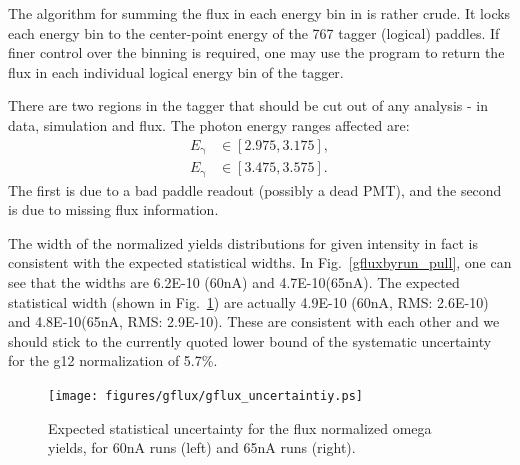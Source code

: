 \begin{v2}
The algorithm for summing the flux in each energy bin in  is rather crude. It locks each energy bin to the center-point energy of the 767 tagger (logical) paddles. If finer control over the binning is required, one may use the  program to return the flux in each individual logical energy bin of the tagger.

There are two regions in the tagger that should be cut out of any analysis - in data, simulation and flux. The photon energy ranges affected are:
\begin{eqnarray}
    E_\text{γ} &\in [2.975,3.175], \\ \nonumber
    E_\text{γ} &\in [3.475,3.575].
\end{eqnarray}
The first is due to a bad paddle readout (possibly a dead PMT), and the second is due to missing flux information.
\end{v2}
The width of the normalized yields distributions for given intensity in fact is consistent with the expected statistical widths. In Fig.~\ref{gfluxbyrun_pull}, one can see that the widths are 6.2E-10 (60nA) and 4.7E-10(65nA). The expected statistical width (shown in Fig.~\ref{gfluxbyrun_uncertain}) are actually 4.9E-10 (60nA, RMS: 2.6E-10) and 4.8E-10(65nA, RMS: 2.9E-10). These are consistent with each other and we should stick to the currently quoted lower bound of the systematic uncertainty for the g12 normalization of 5.7\%. 
\begin{figure}[htpb]
	\begin{center}
		\texttt{[image: figures/gflux/gflux\_uncertaintiy.ps]}
		\caption{Expected statistical uncertainty for the flux normalized omega yields, for 60nA runs (left) and 65nA runs (right).}
		\label{gfluxbyrun_uncertain}
	\end{center}
\end{figure}
\FloatBarrier
